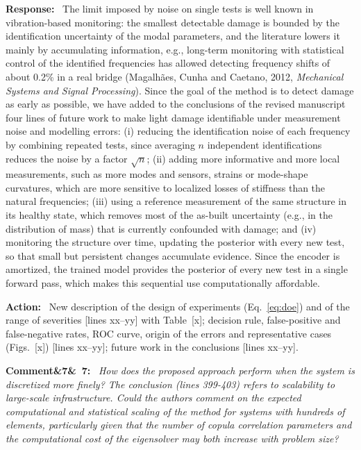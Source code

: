 \documentclass[11pt]{article}
\newenvironment{rcomment}[1]{\par\bigskip\noindent\textbf{Comment\ifx&#1&\else\ #1\fi:}\ \itshape}{\par}
\newenvironment{response}{\par\smallskip\noindent\color{resp}\textbf{Response:}\ }{\par}
\newenvironment{action}{\par\smallskip\noindent\color{resp}\textbf{Action:}\ }{\par}
\newcommand{\tbd}[1]{\textcolor{note}{\textsf{[#1]}}}
\newcommand{\lines}[1]{\tbd{lines #1}}
\begin{document}
\begin{response}
The limit imposed by noise on single tests is well known in vibration-based monitoring: the smallest detectable
damage is bounded by the identification uncertainty of the modal parameters, and the literature lowers it mainly by
accumulating information, e.g., long-term monitoring with statistical control of the identified frequencies has
allowed detecting frequency shifts of about 0.2\% in a real bridge (Magalh\~aes, Cunha and Caetano, 2012,
\emph{Mechanical Systems and Signal Processing}). Since the goal of the method is to detect damage as early as
possible, we have added to the conclusions of the revised manuscript four lines of future work to make light damage identifiable
under measurement noise and modelling errors: (i) reducing the identification noise of each frequency by combining repeated tests, since averaging $n$ independent identifications reduces the noise by a factor $\sqrt{n}$; (ii) adding more informative and more local measurements, such as more modes and sensors, strains or mode-shape curvatures, which are more sensitive to localized losses of stiffness than the natural frequencies; (iii) using a reference measurement of the same structure in its healthy state, which removes most of the as-built uncertainty (e.g., in the distribution of mass) that is currently confounded with damage; and (iv) monitoring the structure over time, updating the posterior with every new test, so that small but persistent changes accumulate evidence. Since the encoder is amortized, the trained model provides the posterior of every new test in a single forward pass, which makes this sequential use computationally affordable.
\end{response}

\begin{action}
New description of the design of experiments (Eq.~\eqref{eq:doe}) and of the range of severities \lines{xx--yy} with
Table~\tbd{x}; decision rule, false-positive and false-negative rates, ROC curve, origin of the errors and representative cases (Figs.~\tbd{x}) \lines{xx--yy}; future work in the conclusions \lines{xx--yy}.
\end{action}

\begin{rcomment}{7}
How does the proposed approach perform when the system is discretized more finely? The conclusion (lines 399-403)
refers to scalability to large-scale infrastructure. Could the authors comment on the expected computational and
statistical scaling of the method for systems with hundreds of elements, particularly given that the number of copula
correlation parameters and the computational cost of the eigensolver may both increase with problem size?
\end{rcomment}
\end{document}
